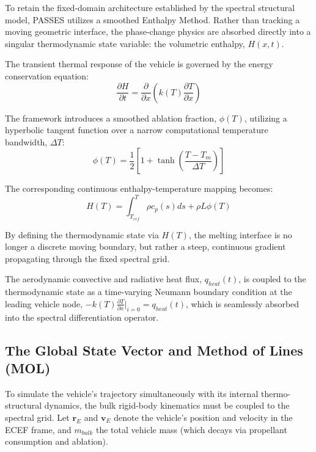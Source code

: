 \documentclass[11pt,a4paper]{article}
\theoremstyle{definition}
\numberwithin{equation}{section}
\begin{document}
To retain the fixed-domain architecture established by the spectral structural model, PASSES utilizes a smoothed Enthalpy Method. Rather than tracking a moving geometric interface, the phase-change physics are absorbed directly into a singular thermodynamic state variable: the volumetric enthalpy, $H(x,t)$. 

The transient thermal response of the vehicle is governed by the energy conservation equation:
\begin{equation}
\frac{\partial H}{\partial t} = \frac{\partial}{\partial x} \left( k(T) \frac{\partial T}{\partial x} \right)
\end{equation}

The framework introduces a smoothed ablation fraction, $\phi(T)$, utilizing a hyperbolic tangent function over a narrow computational temperature bandwidth, $\Delta T$:
\begin{equation}
\phi(T) = \frac{1}{2} \left[ 1 + \tanh\left(\frac{T - T_m}{\Delta T}\right) \right]
\end{equation}

The corresponding continuous enthalpy-temperature mapping becomes:
\begin{equation}
H(T) = \int_{T_{ref}}^{T} \rho c_p(s) ds + \rho L \phi(T)
\end{equation}

By defining the thermodynamic state via $H(T)$, the melting interface is no longer a discrete moving boundary, but rather a steep, continuous gradient propagating through the fixed spectral grid. 

The aerodynamic convective and radiative heat flux, $q_{heat}(t)$, is coupled to the thermodynamic state as a time-varying Neumann boundary condition at the leading vehicle node, $-k(T) \frac{\partial T}{\partial x} \big|_{i=0} = q_{heat}(t)$, which is seamlessly absorbed into the spectral differentiation operator.

\subsection{The Global State Vector and Method of Lines (MOL)}

To simulate the vehicle's trajectory simultaneously with its internal thermo-structural dynamics, the bulk rigid-body kinematics must be coupled to the spectral grid. Let $\mathbf{r}_E$ and $\mathbf{v}_E$ denote the vehicle's position and velocity in the ECEF frame, and $m_{bulk}$ the total vehicle mass (which decays via propellant consumption and ablation). 
\end{document}
